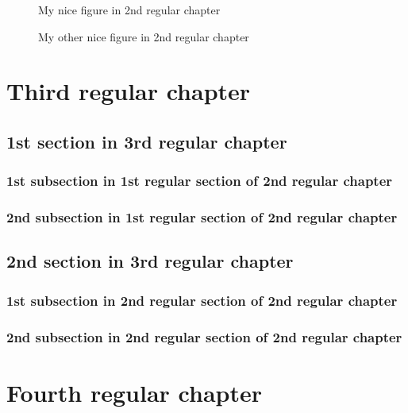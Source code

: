 \documentclass{book}
\begin{document}
\begin{figure}
\caption{My nice figure in 2nd regular chapter}
\end{figure}


\begin{figure}
\caption{My other nice figure in 2nd regular chapter}
\end{figure}





\chapter{Third regular chapter}

\section{1st section in 3rd regular chapter}

\subsection{1st subsection in 1st regular section of 2nd regular chapter}
\subsection{2nd subsection in 1st regular section of 2nd regular chapter}

\section{2nd section in 3rd regular chapter}

\subsection{1st subsection in 2nd regular section of 2nd regular chapter}
\subsection{2nd subsection in 2nd regular section of 2nd regular chapter}

\chapter{Fourth regular chapter}



\end{document}
